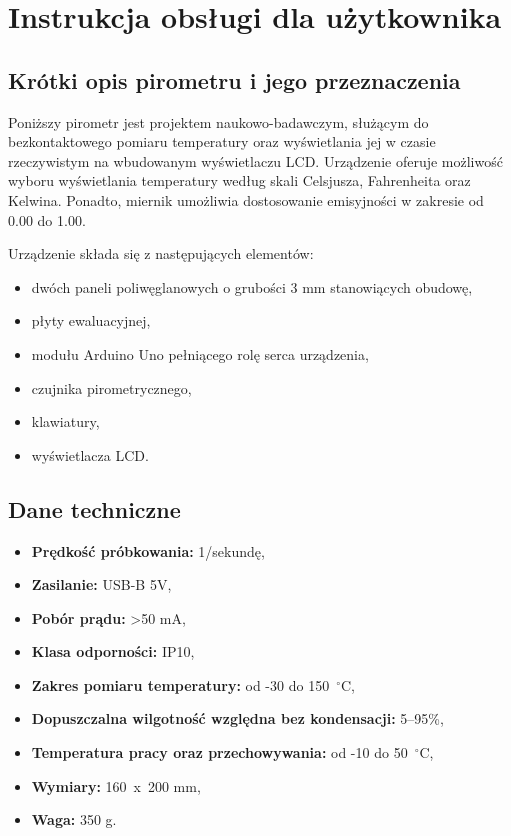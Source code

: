 \chapter{Instrukcja obsługi dla użytkownika}
\section{Krótki opis pirometru i jego przeznaczenia}

Poniższy pirometr jest projektem naukowo-badawczym, służącym do bezkontaktowego pomiaru temperatury oraz wyświetlania jej w czasie rzeczywistym na wbudowanym wyświetlaczu LCD. Urządzenie oferuje możliwość wyboru wyświetlania temperatury według skali Celsjusza, Fahrenheita oraz Kelwina. Ponadto, miernik umożliwia dostosowanie emisyjności w zakresie od 0.00 do 1.00.

\vspace{12pt}

Urządzenie składa się z następujących elementów:
\begin{itemize}
    \item dwóch paneli poliwęglanowych o grubości 3 mm stanowiących obudowę,
    \item płyty ewaluacyjnej,
    \item modułu Arduino Uno pełniącego rolę serca urządzenia,
    \item czujnika pirometrycznego,
    \item klawiatury,
    \item wyświetlacza LCD.
\end{itemize}

\section{Dane techniczne}
\begin{itemize}
    \item \textbf{Prędkość próbkowania:} 1/sekundę,
    \item \textbf{Zasilanie:} USB-B 5V,
    \item \textbf{Pobór prądu:} >50 mA,
    \item \textbf{Klasa odporności:} IP10,
    \item \textbf{Zakres pomiaru temperatury:} od -30 do 150~$^{\circ}$C,
    \item \textbf{Dopuszczalna wilgotność względna bez kondensacji:} 5--95\%,
    \item \textbf{Temperatura pracy oraz przechowywania:} od -10 do 50~$^{\circ}$C,
    \item \textbf{Wymiary:} 160~x~200 mm,
    \item \textbf{Waga:} 350 g.
\end{itemize}

